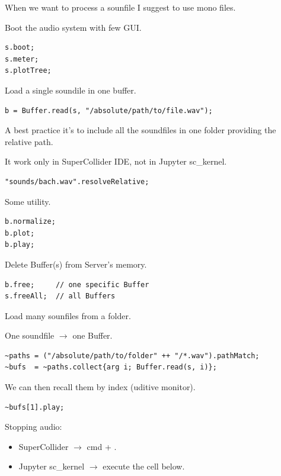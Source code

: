 When we want to process a sounfile I suggest to use mono files.

Boot the audio system with few GUI.

\begin{lstlisting}[frame=single] 
s.boot;
s.meter;
s.plotTree;
\end{lstlisting}

Load a single soundile in one buffer.

\begin{lstlisting}[frame=single, caption=Load one sound file in a Buffer] 
b = Buffer.read(s, "/absolute/path/to/file.wav"); 
\end{lstlisting}

A best practice it's to include all the soundfiles in one folder providing the relative path.

It work only in SuperCollider IDE, not in Jupyter sc\_kernel.

\begin{lstlisting}[frame=single] 
"sounds/bach.wav".resolveRelative;
\end{lstlisting}

Some utility.

\begin{lstlisting}[frame=single] 
b.normalize; 
b.plot;      
b.play;      
\end{lstlisting}

Delete Buffer(s) from Server's memory.

\begin{lstlisting}[frame=single] 
b.free;     // one specific Buffer
s.freeAll;  // all Buffers
\end{lstlisting}

Load many sounfiles from a folder.

One soundfile \(\rightarrow\) one Buffer.

\begin{lstlisting}[frame=single,caption=Load many sounfiles from a folder] 
~paths = ("/absolute/path/to/folder" ++ "/*.wav").pathMatch; 
~bufs  = ~paths.collect{arg i; Buffer.read(s, i)};
\end{lstlisting}

We can then recall them by index (uditive monitor).

\begin{lstlisting}[frame=single] 
~bufs[1].play; 
\end{lstlisting}

Stopping audio:

\begin{itemize}
\tightlist
\item SuperCollider \(\rightarrow\) cmd + .
\item Jupyter sc\_kernel \(\rightarrow\) execute the cell below.
\end{itemize}

